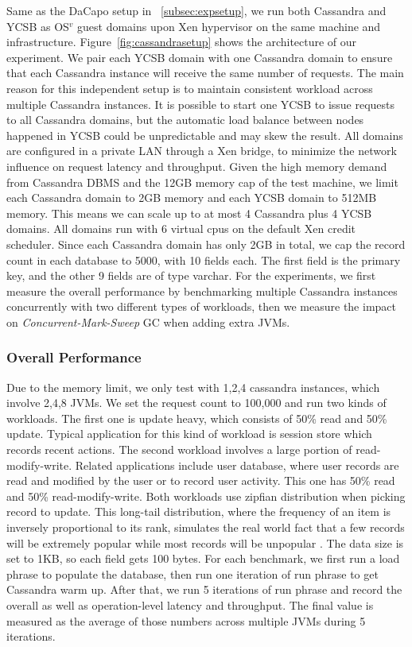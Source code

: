 \documentclass{sig-alternate}
\begin{document}
Same as the DaCapo setup in ~\ref{subsec:expsetup}, we run both Cassandra and YCSB as OS$^{v}$ guest domains upon Xen hypervisor on the same machine and infrastructure. Figure~\ref{fig:cassandrasetup} shows the architecture of our experiment. We pair each YCSB domain with one Cassandra domain to ensure that each Cassandra instance will receive the same number of requests. The main reason for this independent setup is to maintain consistent workload across multiple Cassandra instances. It is possible to start one YCSB to issue requests to all Cassandra domains, but the automatic load balance between nodes happened in YCSB could be unpredictable and may skew the result. All domains are configured in a private LAN through a Xen bridge, to minimize the network influence on request latency and throughput. Given the high memory demand from Cassandra DBMS and the 12GB memory cap of the test machine, we limit each Cassandra domain to 2GB memory and each YCSB domain to 512MB memory. This means we can scale up to at most 4 Cassandra plus 4 YCSB domains. All domains run with 6 virtual cpus on the default Xen credit scheduler. Since each Cassandra domain has only 2GB in total, we cap the record count in each database to 5000, with 10 fields each. The first field is the primary key, and the other 9 fields are of type varchar. For the experiments, we first measure the overall performance by benchmarking multiple Cassandra instances concurrently with two different types of workloads, then we measure the impact on \textit{Concurrent-Mark-Sweep} GC when adding extra JVMs.

\subsubsection{Overall Performance}
Due to the memory limit, we only test with 1,2,4 cassandra instances, which involve 2,4,8 JVMs. We set the request count to 100,000 and run two kinds of workloads. The first one is update heavy, which consists of 50\% read and 50\% update. Typical application for this kind of workload is session store which records recent actions. The second workload involves a large portion of read-modify-write. Related applications include user database, where user records are read and modified by the user or to record user activity. This one has 50\% read and 50\% read-modify-write. Both workloads use zipfian distribution when picking record to update. This long-tail distribution, where the frequency of an item is inversely proportional to its rank, simulates the real world fact that a few records will be extremely popular while most records will be unpopular \cite{adamic2002zipf}. The data size is set to 1KB, so each field gets 100 bytes. For each benchmark, we first run a load phrase to populate the database, then run one iteration of run phrase to get Cassandra warm up. After that, we run 5 iterations of run phrase and record the overall as well as operation-level latency and throughput. The final value is measured as the average of those numbers across multiple JVMs during 5 iterations.
\end{document}
